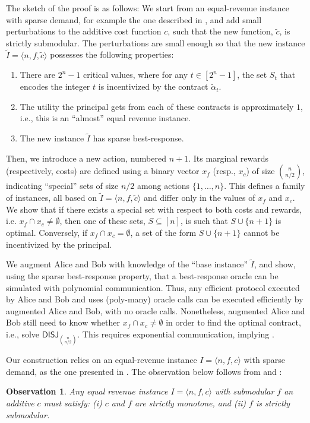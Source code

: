 \documentclass[11pt]{article}
\newtheorem{observation}{Observation}
\newcommand{\instanceI}{I=\langle n, f, c \rangle}
\newcommand{\inst}[3]{\langle #1, #2, #3 \rangle}
\newcommand{\DISJ}[1]{\mathsf{DISJ}_{#1}}
\newcommand{\tc}{\tilde{c}}
\newcommand{\talpha}{\tilde{\alpha}}
\newcommand{\tI}{\tilde{I}}
\newcommand{\InstTildeI}{\tI = \inst{n}{f}{\tc}}
\begin{document}
The sketch of the proof is as follows:
We start from an equal-revenue instance with sparse demand, for example the one described in , and add small perturbations to the additive cost function $c$, such that the new function, $\tc$, is strictly submodular.
The perturbations are small enough so that the new instance $\tilde{I} = \inst{n}{f}{\tc}$ possesses the following properties:
\begin{enumerate}
    \item There are $2^n-1$ critical values, where 
    for any $t \in [2^n-1]$, the set $S_t$ that encodes the integer $t$ is incentivized by the contract $\talpha_t$.
    \item The utility the principal gets from each of these contracts is approximately $1$, i.e., this is an ``almost'' equal revenue instance.
    \item The new instance $\tI$ has sparse best-response.
\end{enumerate}

Then, we introduce a new action, numbered $n+1$. Its marginal rewards (respectively, costs) are defined using a binary vector $x_f$ (resp., $x_c$) of size $\binom{n}{n/2}$, indicating ``special'' sets of size $n/2$ among actions $\{1,\dots,n\}$. This defines a family of instances, all based on $\InstTildeI$ and differ only in the values of $x_f$ and $x_c$.
We show that if there exists a special set with respect to both costs and rewards, i.e. $x_f \cap x_c \ne \emptyset$, then one of these sets, $S \subseteq [n]$, is such that $S \cup \{n+1\}$ is optimal. Conversely, if $x_f \cap x_c = \emptyset$, a set of the form $S \cup \{n+1\}$ cannot be incentivized by the principal.

We augment Alice and Bob with knowledge of the ``base instance'' $\tI$, and show, using the sparse best-response property, that a best-response oracle can be simulated with polynomial communication.
Thus, any efficient protocol executed by Alice and Bob and uses (poly-many) oracle calls can be executed efficiently by augmented Alice and Bob, with no oracle calls.
Nonetheless, augmented Alice and Bob still need to know whether $x_f \cap x_c \ne \emptyset$ in order to find the optimal contract, i.e., solve $\DISJ{\binom{n}{n/2}}$. This requires exponential communication, implying .

Our construction relies on an equal-revenue instance $\instanceI$ with sparse demand, as the one presented in . The observation below follows from  and :
\begin{observation}\label{obs:equalrev_subModf_prop}
    Any equal revenue instance $\instanceI$ with submodular $f$ an additive $c$ must satisfy:
    (i) $c$ and $f$ are strictly monotone, and (ii) $f$ is strictly submodular.
\end{observation}
\end{document}
